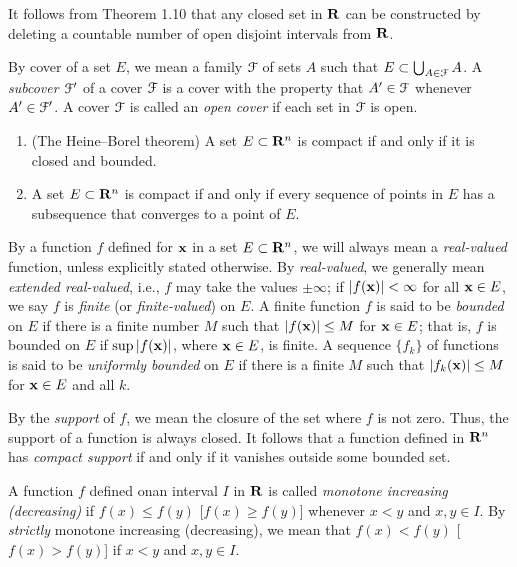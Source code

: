 It follows from Theorem 1.10 that any closed set in $\mathbf{R}$ can be
constructed by deleting a countable number of open disjoint intervals from
$\mathbf{R}$.

By cover of a set $E$, we mean a family $\mathcal{F}$ of sets $A$ such that
$E\subset\bigcup_{A\in\mathcal{F}} A$. A \emph{subcover $\mathcal{F}'$} of a cover
$\mathcal{F}$ is a cover with the property that $A'\in\mathcal{F}$ whenever
$A'\in\mathcal{F}'$. A cover $\mathcal{F}$ is called an \emph{open cover} if each set
in $\mathcal{F}$ is open.
\begin{theorem}[1.12]
\begin{enumerate}[label=\textnormal{(\alph*)}]
\item (The Heine--Borel theorem) A set $E\subset\mathbf{R}^n$ is compact if and
  only if it is closed and bounded.
\item A set $E\subset\mathbf{R}^n$ is compact if and only if every sequence of
  points in $E$ has a subsequence that converges to a point of $E$.
\end{enumerate}
\end{theorem}

By a function $f$ defined for $\mathbf{x}$ in a set $E\subset\mathbf{R}^n$, we will
always mean a \emph{real-valued} function, unless explicitly stated
otherwise. By \emph{real-valued}, we generally mean \emph{extended
  real-valued}, i.e., $f$ may take the values $\pm\infty$; if
$|f(\mathbf{x})|<\infty$ for all $\mathbf{x}\in E$, we say $f$ is \emph{finite} (or
\emph{finite-valued}) on $E$. A finite function $f$ is said to be
\emph{bounded} on $E$ if there is a finite number $M$ such that
$|f(\mathbf{x})|\leq M$ for $\mathbf{x}\in E$; that is, $f$ is bounded on $E$ if $\sup
|f(\mathbf{x})|$, where $\mathbf{x}\in E$, is finite. A sequence ${\{f_k\}}$ of
functions is said to be \emph{uniformly bounded} on $E$ if there is a
finite $M$ such that $|f_k(\mathbf{x})|\leq M$ for $\mathbf{x}\in E$ and all $k$.

By the \emph{support} of $f$, we mean the closure of the set where $f$ is
not zero. Thus, the support of a function is always closed. It follows that
a function defined in $\mathbf{R}^n$ has \emph{compact support} if and only if it
vanishes outside some bounded set.

A function $f$ defined onan interval $I$ in $\mathbf{R}$ is called \emph{monotone
increasing (decreasing)} if $f(x)\leq f(y)$ [$f(x)\geq f(y)$] whenever
$x<y$ and $x,y\in I$. By \emph{strictly} monotone increasing (decreasing),
we mean that $f(x)<f(y)$ [$f(x)>f(y)$] if $x<y$ and $x,y\in I$.

